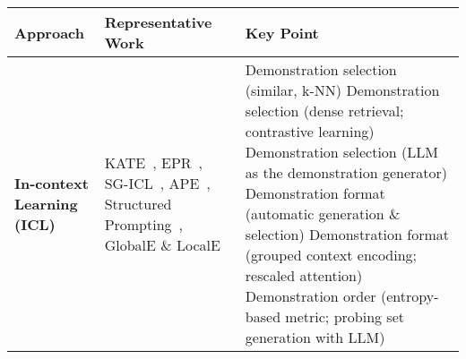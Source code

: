 \begin{table}[h!]
	\centering
	\tiny
	\begin{tabularx}{\textwidth}{|l|X|X|}
		\hline
		\textbf{Approach}                         & \textbf{Representative Work}                                                                                                                                                                                                                                                                                                                                                                                                                                                                              & \textbf{Key Point}                                                                                                                                                                                                                                                                                                                                                                                                                                                                                                                                                                                                                                                                                                                                                                                                                                                          \\
		\hline
		\textbf{In-context Learning (ICL)}        & KATE~\cite{liu2022good}, EPR~\cite{rubin2022learning}, SG-ICL~\cite{kim2022self}, APE~\cite{zhou2023large}, Structured Prompting~\cite{hao2022structured}, GlobalE \& LocalE~\cite{lu2022fantastically}                                                                                                                                                                                                                                                                                                   & Demonstration selection (similar, k-NN) \newline Demonstration selection (dense retrieval; contrastive learning) \newline Demonstration selection (LLM as the demonstration generator) \newline Demonstration format (automatic generation \& selection) \newline Demonstration format (grouped context encoding; rescaled attention) \newline Demonstration order (entropy-based metric; probing set generation with LLM)                                                                                                                                                                                                                                                                                                                                                                                                                                                  \\

\end{tabularx}
\end{table}
